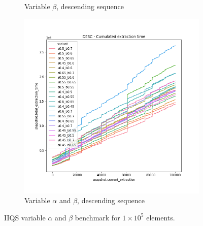 \begin{figure}
\begin{subfigure}[b]{0.32\textwidth}
        \caption{Variable $\beta$, descending sequence}
        \label{FIG:05_ALPHABETA_BENCHMARK_DESC_RIGHT}
    \end{subfigure}
    \hfill
    \begin{subfigure}[b]{0.32\textwidth}
        \centering
        \includegraphics[width=\textwidth]{./fragments/04_experimental_execution/images/04_alphabeta_detail_decreasing_inner.png.0_0.png}
        \caption{Variable $\alpha$ and $\beta$, descending sequence}
        \label{FIG:05_ALPHABETA_BENCHMARK_DESC_INNER}
    \end{subfigure}
    \vfill


    
    \caption{IIQS variable $\alpha$ and $\beta$ benchmark  for $1\times10^5$ elements.}
    \label{FIG:BENCHMARK_05_ALPHABETA_GRAND}
\end{figure}




